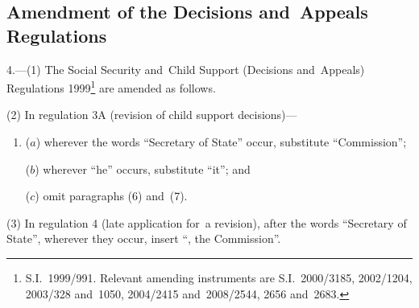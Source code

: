 \documentclass[12pt,a4paper]{article}
\begin{document}

%

\subsection[4. Amendment of the Decisions and~Appeals Regulations]{Amendment of the Decisions and~Appeals Regulations}

4.---(1)  The Social Security and~Child Support (Decisions and~Appeals) Regulations 1999\footnote{S.I.~1999/991. Relevant amending instruments are S.I.~2000/3185, 2002/1204, 2003/328 and~1050, 2004/2415 and~2008/2544, 2656 and~2683.} are amended as follows.

(2) In regulation 3A (revision of child support decisions)—
\begin{enumerate}\item[]
($a$) wherever the words “Secretary of State” occur, substitute “Commission”;

($b$) wherever “he” occurs, substitute “it”; and

($c$) omit paragraphs (6) and~(7).
\end{enumerate}

(3) In regulation 4 (late application for~a revision), after the words “Secretary of State”, wherever they occur, insert “, the Commission”.
\end{document}

